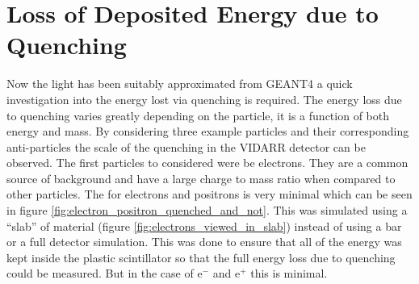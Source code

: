 \section{Loss of Deposited Energy due to Quenching}\label{sec:geant4Simulation_quenchingLoss}
Now the light has been suitably approximated from GEANT4 a quick investigation into the energy lost via quenching is required. The energy loss due to quenching varies greatly depending on the particle, it is a function of both energy and mass. By considering three example particles and their corresponding anti-particles the scale of the quenching in the VIDARR detector can be observed. The first particles to considered were be electrons. They are a common source of background and have a large charge to mass ratio when compared to other particles. The for electrons and positrons is very minimal which can be seen in figure \ref{fig:electron_positron_quenched_and_not}. This was simulated using a ``slab'' of material (figure \ref{fig:electrons_viewed_in_slab}) instead of using a bar or a full detector simulation. This was done to ensure that all of the energy was kept inside the plastic scintillator so that the full energy loss due to quenching could be measured. But in the case of e$^-$ and e$^+$ this is minimal. 

